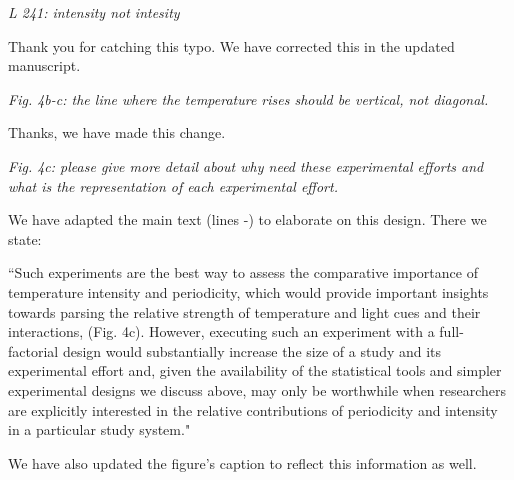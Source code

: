 \documentclass[11pt]{article}
\begin{document}
\emph{L 241: intensity not intesity}

Thank you for catching this typo. We have corrected this in the updated manuscript.

\emph{Fig. 4b-c: the line where the temperature rises should be vertical, not diagonal.}

Thanks, we have made this change.

\emph{Fig. 4c: please give more detail about why need these experimental efforts and what is the representation of each experimental effort.}

 We have adapted the main text (lines -) to elaborate on this design. There we state:
 
``Such experiments are the best way to assess the comparative importance of temperature intensity and periodicity, which would provide important insights towards parsing the relative strength of temperature and light cues and their interactions,  (Fig. 4c). However, executing such an experiment with a full-factorial design would substantially increase the size of a study and its experimental effort and, given the availability of the statistical tools and simpler experimental designs we discuss above, may only be worthwhile when researchers are explicitly interested in the relative contributions of periodicity and intensity in a particular study system."
 
We have also updated the figure's caption to reflect this information as well.
\end{document}
